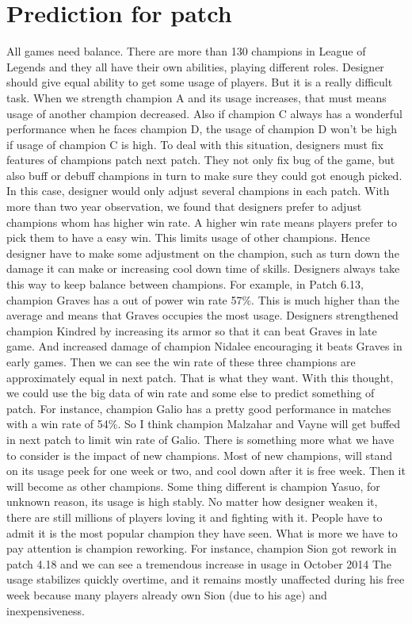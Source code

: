 \documentclass[sigconf]{acmart}
\begin{document}
\section{Prediction for patch}
All games need balance. There are more than 130 champions in League of Legends and they all have their own abilities, playing different roles. Designer should give equal ability to get some usage of players. But it is a really difficult task. When we strength champion A and its usage increases, that must means usage of another champion decreased. Also if champion C always has a wonderful performance when he faces champion D, the usage of champion D won't be high if usage of champion C is high. To deal with this situation, designers must fix features of champions patch next patch. They not only fix bug of the game, but also buff or debuff champions  in turn to make sure they could got enough picked. In this case, designer would only adjust several champions in each patch. With more than two year observation, we found that designers prefer to adjust champions whom has higher win rate. A higher win rate means players prefer to pick them to have a easy win. This limits usage of other champions. Hence designer have to make some adjustment on the champion, such as turn down the damage it can make or increasing cool down time of skills. Designers always take this way to keep balance between champions. For example, in Patch 6.13, champion Graves has a out of power win rate 57\%. This is much higher than the average and means that Graves occupies the most usage. Designers strengthened champion Kindred by increasing its armor so that it can beat Graves in late game. And increased damage of champion Nidalee encouraging it beats Graves in early games. Then we can see the win rate of these three champions are approximately equal in next patch. That is what they want. With this thought, we could use the big data of win rate and some else to predict something of patch. For instance, champion Galio has a pretty good performance in matches with a win rate of 54\%. So I think champion Malzahar and Vayne will get buffed in next patch to limit win rate of Galio. There is something more what we have to consider is the impact of new champions. Most of new champions, will stand on its usage peek for one week or two, and cool down after it is free week. Then it will become as other champions. Some thing different is champion Yasuo, for unknown reason, its usage is high stably. No matter how designer weaken it, there are still millions of players loving it and fighting with it. People have to admit it is the most popular champion they have seen. What is more we have to pay attention is champion reworking. For instance, champion Sion got rework in patch 4.18 and we can see a tremendous increase in usage in October 2014  The usage stabilizes quickly overtime, and it remains mostly unaffected during his free week because many players already own Sion (due to his age) and inexpensiveness. \cite{aaa}
\end{document}
